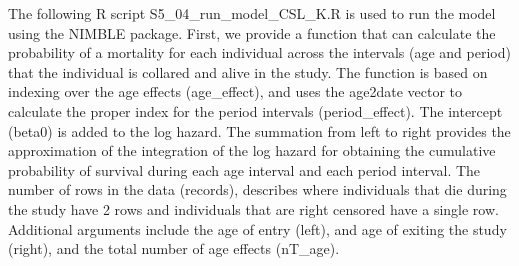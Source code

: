 \documentclass[11pt,]{article}
\begin{document}
The following R script S5\_04\_run\_model\_CSL\_K.R is used to run the
model using the NIMBLE package. First, we provide a function that can
calculate the probability of a mortality for each individual across the
intervals (age and period) that the individual is collared and alive in
the study. The function is based on indexing over the age effects
(age\_effect), and uses the age2date vector to calculate the proper
index for the period intervals (period\_effect). The intercept (beta0)
is added to the log hazard. The summation from left to right provides
the approximation of the integration of the log hazard for obtaining the
cumulative probability of survival during each age interval and each
period interval. The number of rows in the data (records), describes
where individuals that die during the study have 2 rows and individuals
that are right censored have a single row. Additional arguments include
the age of entry (left), and age of exiting the study (right), and the
total number of age effects (nT\_age).
\end{document}
